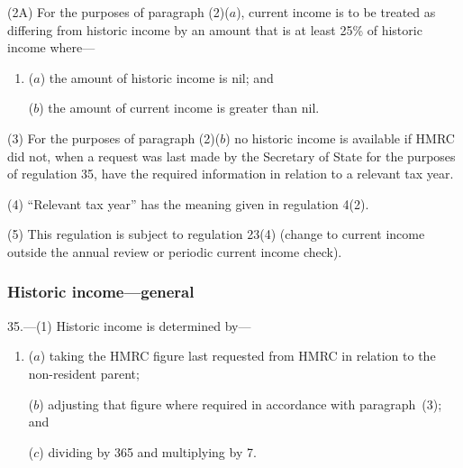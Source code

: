 \documentclass[12pt,a4paper]{article}
\begin{document}
(2A) For the purposes of paragraph (2)($a$), current income is to be treated as differing from historic income by an amount that is at least 25\% of historic income where—
\begin{enumerate}\item[]
($a$) the amount of historic income is nil; and

($b$) the amount of current income is greater than nil.
\end{enumerate}

(3) For the purposes of paragraph (2)($b$)  no historic income is available if HMRC did not, when a request was last made by the Secretary of State for the purposes of regulation 35, have the required information in relation to a relevant tax year.

(4) “Relevant tax year” has the meaning given in regulation 4(2).

(5) This regulation is subject to regulation 23(4) (change to current income outside the annual review or periodic current income check).


\subsubsection[35. Historic income---general]{Historic income---general}

35.---(1)  Historic income is determined by—
\begin{enumerate}\item[]
($a$) taking the HMRC figure last requested from HMRC in relation to the non-resident parent;

\begin{sloppypar}
($b$) adjusting that figure where required in accordance with paragraph~(3); and
\end{sloppypar}

($c$) dividing by 365 and multiplying by 7.
\end{enumerate}
\end{document}
